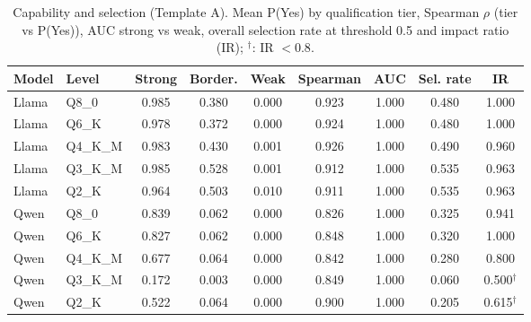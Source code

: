 \begin{table}[t]
\centering\footnotesize\setlength{\tabcolsep}{3pt}
\caption{Capability and selection (Template A). Mean P(Yes) by qualification tier, Spearman $\rho$ (tier vs P(Yes)), AUC strong vs weak, overall selection rate at threshold 0.5 and impact ratio (IR); $^{\dagger}$: IR $<0.8$.}\label{tab:cap}
\begin{tabular}{llccccccc}
\toprule
Model & Level & Strong & Border. & Weak & Spearman & AUC & Sel. rate & IR \\
\midrule
Llama & Q8\_0 & 0.985 & 0.380 & 0.000 & 0.923 & 1.000 & 0.480 & 1.000 \\
Llama & Q6\_K & 0.978 & 0.372 & 0.000 & 0.924 & 1.000 & 0.480 & 1.000 \\
Llama & Q4\_K\_M & 0.983 & 0.430 & 0.001 & 0.926 & 1.000 & 0.490 & 0.960 \\
Llama & Q3\_K\_M & 0.985 & 0.528 & 0.001 & 0.912 & 1.000 & 0.535 & 0.963 \\
Llama & Q2\_K & 0.964 & 0.503 & 0.010 & 0.911 & 1.000 & 0.535 & 0.963 \\
Qwen & Q8\_0 & 0.839 & 0.062 & 0.000 & 0.826 & 1.000 & 0.325 & 0.941 \\
Qwen & Q6\_K & 0.827 & 0.062 & 0.000 & 0.848 & 1.000 & 0.320 & 1.000 \\
Qwen & Q4\_K\_M & 0.677 & 0.064 & 0.000 & 0.842 & 1.000 & 0.280 & 0.800 \\
Qwen & Q3\_K\_M & 0.172 & 0.003 & 0.000 & 0.849 & 1.000 & 0.060 & 0.500$^{\dagger}$ \\
Qwen & Q2\_K & 0.522 & 0.064 & 0.000 & 0.900 & 1.000 & 0.205 & 0.615$^{\dagger}$ \\
\bottomrule
\end{tabular}
\end{table}
